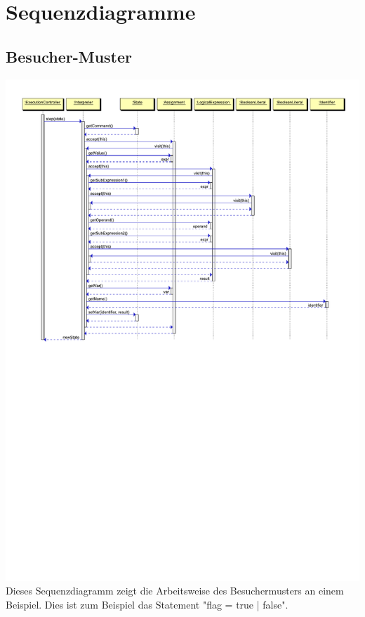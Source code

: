 \documentclass[10pt,a4paper,titlepage]{article}
\begin{document}
\section{Sequenzdiagramme}
\subsection{Besucher-Muster}
\includegraphics[scale=0.9]{images/Visitor_Pattern.pdf} \newline
Dieses Sequenzdiagramm zeigt die Arbeitsweise des Besuchermusters an einem Beispiel. Dies ist zum Beispiel das Statement "flag = true | false".
\end{document}
